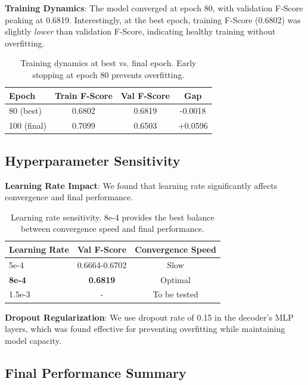 \textbf{Training Dynamics}: The model converged at epoch 80, with validation F-Score peaking at 0.6819. Interestingly, at the best epoch, training F-Score (0.6802) was slightly \textit{lower} than validation F-Score, indicating healthy training without overfitting.

\begin{table}[h]
\centering
\small
\begin{tabular}{lccc}
\hline
Epoch & Train F-Score & Val F-Score & Gap \\
\hline
80 (best) & 0.6802 & 0.6819 & -0.0018 \\
100 (final) & 0.7099 & 0.6503 & +0.0596 \\
\hline
\end{tabular}
\caption{Training dynamics at best vs. final epoch. Early stopping at epoch 80 prevents overfitting.}
\end{table}

\subsection{Hyperparameter Sensitivity}

\textbf{Learning Rate Impact}: We found that learning rate significantly affects convergence and final performance.

\begin{table}[h]
\centering
\small
\begin{tabular}{lcc}
\hline
Learning Rate & Val F-Score & Convergence Speed \\
\hline
5e-4 & 0.6664-0.6702 & Slow \\
\textbf{8e-4} & \textbf{0.6819} & Optimal \\
1.5e-3 & - & To be tested \\
\hline
\end{tabular}
\caption{Learning rate sensitivity. 8e-4 provides the best balance between convergence speed and final performance.}
\end{table}

\textbf{Dropout Regularization}: We use dropout rate of 0.15 in the decoder's MLP layers, which was found effective for preventing overfitting while maintaining model capacity.

\subsection{Final Performance Summary}

